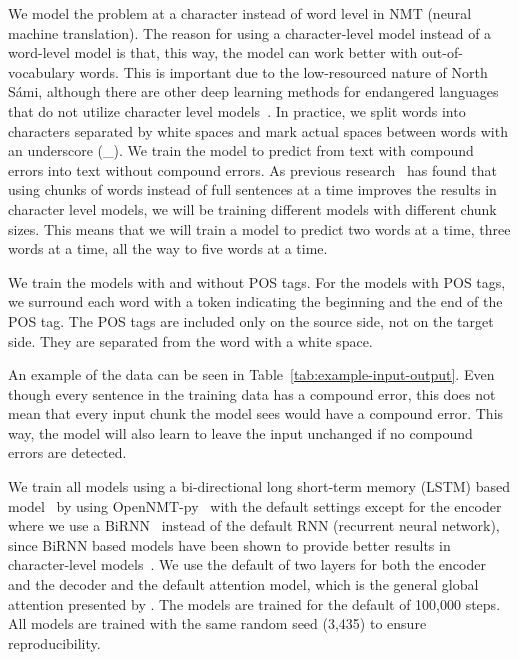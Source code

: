 \documentclass[postprint]{flammie}
\begin{document}
We model the problem at a character instead of word level in NMT (neural machine
translation). The reason for using a character-level model instead of a
word-level model is that, this way, the model can work better with
out-of-vocabulary words. This is important due to the low-resourced nature of
North Sámi, although there are other deep learning methods for endangered
languages that do not utilize character level models~\cite{alnajjar2021when}. In
practice, we split words into characters separated by white spaces and mark
actual spaces between words with an underscore (\_).  We train the model to
predict from text with compound errors into text without compound errors. As
previous research~\cite{partanen-etal-2019-dialect,alnajjar2020automated} has
found that using chunks of words instead of full sentences at a time improves
the results in character level models, we will be training different models with
different chunk sizes.  This means that we will train a model to predict two
words at a time, three words at a time, all the way to five words at a time.

We train the models with and without POS tags. For the models with POS tags, we
surround each word with a token indicating the beginning and the end of the POS
tag. The POS tags are included only on the source side, not on the target side.
They are separated from the word with a white space.

An example of the data can be seen in Table~\ref{tab:example-input-output}. Even
though every sentence in the training data has a compound error, this does not
mean that every input chunk the model sees would have a compound error. This
way, the model will also learn to leave the input unchanged if no compound
errors are detected.

We train all models using a bi-directional long short-term memory (LSTM) based
model~\cite{hochreiter1997long} by using OpenNMT-py~\cite{opennmt} with the
default settings except for the encoder where we use a
BiRNN~\cite{schuster1997bidirectional} instead of the default RNN (recurrent
neural network), since BiRNN based models have been shown to provide better
results in character-level models~\cite{hamalainen2019revisiting}.  We use the
default of two layers for both the encoder and the decoder and the default
attention model, which is the general global attention presented by
\cite{luong2015effective}.  The models are trained for the default of 100,000
steps. All models are trained with the same random seed (3,435) to ensure
reproducibility.
\end{document}
